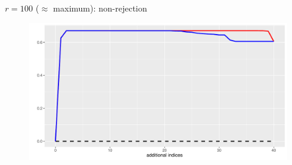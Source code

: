 \documentclass[aspectratio=169]{beamer}
\begin{document}
\begin{frame}{$r=100$ ($\approx$ maximum): non-rejection}
\begin{figure}
\centering
\includegraphics[scale=0.6]{plot100.pdf}
\end{figure}
\end{frame}















\end{document}
